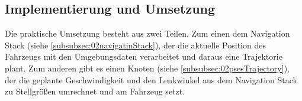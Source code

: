 \subsection{Implementierung und Umsetzung}
\label{subsec:02implementierung}
Die praktische Umsetzung besteht aus zwei Teilen. Zum einen dem Navigation Stack (siehe \ref{subsubsec:02navigatinStack}), der die aktuelle Position des Fahrzeugs mit den Umgebungsdaten verarbeitet und daraus eine Trajektorie plant. Zum anderen gibt es einen Knoten (siehe \ref{subsubsec:02psesTrajectory}), der die geplante Geschwindigkeit und den Lenkwinkel aus dem Navigation Stack zu Stellgr\"o\ss{}en umrechnet und am Fahrzeug setzt. 

